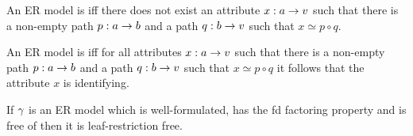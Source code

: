 \begin{definition} 
An  ER model is  iff 
there does not exist an attribute $x:a \rightarrow v$
such that there is a non-empty  path $p:a \rightarrow b$ and a path $q:b \rightarrow v$ such that
$x \simeq p \circ q$.
\end{definition}

\begin{definition} 
An  ER model is  iff 
for all attributes $x:a \rightarrow v$
such that there is a non-empty  path $p:a \rightarrow b$ and a path $q:b \rightarrow v$ such that
$x \simeq p \circ q$ it follows that the attribute $x$ is identifying.
\end{definition}

\begin{lemma}
If $\gamma$ is an ER model which is well-formulated, has the fd factoring property and is free of  
then it is leaf-restriction free.
\end{lemma}
